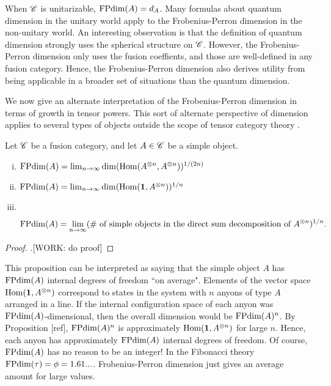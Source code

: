 When $\mathscr{C}$ is unitarizable, $\operatorname{FPdim}(A)=d_A$. Many formulas about quantum dimension in the unitary world apply to the Frobenius-Perron dimension in the non-unitary world. An interesting observation is that the definition of quantum dimension strongly uses the spherical structure on $\mathscr{C}$. However, the Frobenius-Perron dimension only uses the fusion coeffients, and those are well-defined in any fusion category. Hence, the Frobenius-Perron dimension also derives utility from being applicable in a broader set of situations than the quantum dimension.

We now give an alternate interpretation of the Frobenius-Perron dimension in terms of growth in tensor powers. This sort of alternate perspective of dimension applies to several types of objects outside the scope of tensor category theory \cite{coulembier2024growth}.

\begin{proposition} Let $\mathscr{C}$ be a fusion category, and let $A\in \mathscr{C}$ be a simple object.

\begin{enumerate}[(i)]
\item $\operatorname{FPdim}(A)=\lim_{n\to\infty}\dim(\operatorname{Hom}(A^{\otimes n},A^{\otimes n}))^{1/(2n)}$
\item $\operatorname{FPdim}(A)=\lim_{n\to\infty}\dim(\operatorname{Hom}(\mathbf{1},A^{\otimes n}))^{1/n}$
\item $\,$

$$\operatorname{FPdim}(A)=\lim_{n\to\infty}(\text{\# of simple objects in the direct sum decomposition of $A^{\otimes n}$})^{1/n}.$$
\end{enumerate}
\end{proposition}
\begin{proof}.[WORK: do proof]
\end{proof}

This proposition can be interpreted as saying that the simple object $A$ has $\operatorname{FPdim}(A)$ internal degrees of freedom ``on average". Elements of the vector space $\operatorname{Hom}(\mathbf{1},A^{\otimes n})$ correspond to states in the system with $n$ anyons of type $A$ arranged in a line. If the internal configuration space of each anyon was $\operatorname{FPdim}(A)$-dimensional, then the overall dimension would be $\operatorname{FPdim}(A)^n$. By Proposition [ref], $\operatorname{FPdim}(A)^n$ is approximately $\operatorname{Hom}(\mathbf{1},A^{\otimes n})$ for large $n$. Hence, each anyon has approximately $\operatorname{FPdim}(A)$ internal degrees of freedom. Of course, $\operatorname{FPdim}(A)$ has no reason to be an integer! In the Fibonacci theory $\operatorname{FPdim}(\tau)=\phi=1.61...$. Frobenius-Perron dimension just gives an average amount for large values.


